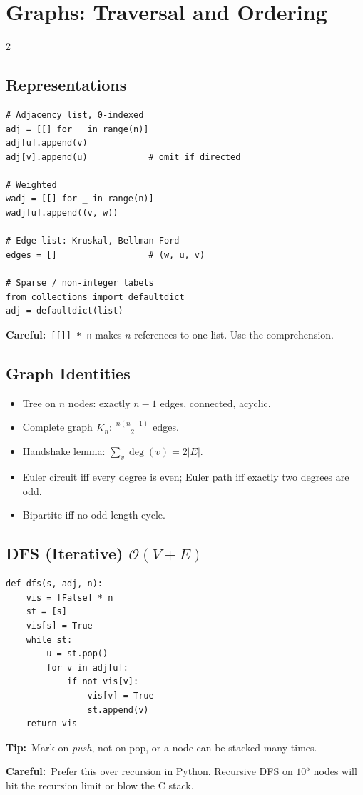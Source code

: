 \documentclass[10pt]{article}
\newcommand{\code}[1]{\texttt{\small #1}}
\newcommand{\sub}[2]{\subsection[#1]{#1\hspace{0.6em}%
  \textnormal{\color{accent2}\small$\mathcal{O}(#2)$}}}
\newcommand{\tip}[1]{{\color{tipc}\footnotesize\textbf{Tip:}}~{\footnotesize #1}\par}
\newcommand{\warn}[1]{{\color{warnc}\footnotesize\textbf{Careful:}}~{\footnotesize #1}\par}
\begin{document}
\section{Graphs: Traversal and Ordering}
\begin{multicols}{2}

\subsection{Representations}
\begin{lstlisting}
# Adjacency list, 0-indexed
adj = [[] for _ in range(n)]
adj[u].append(v)
adj[v].append(u)            # omit if directed

# Weighted
wadj = [[] for _ in range(n)]
wadj[u].append((v, w))

# Edge list: Kruskal, Bellman-Ford
edges = []                  # (w, u, v)

# Sparse / non-integer labels
from collections import defaultdict
adj = defaultdict(list)
\end{lstlisting}
\warn{\code{[[]] * n} makes $n$ references to one list. Use the
comprehension.}

\subsection{Graph Identities}
\begin{itemize}
    \item Tree on $n$ nodes: exactly $n-1$ edges, connected, acyclic.
    \item Complete graph $K_n$: $\frac{n(n-1)}{2}$ edges.
    \item Handshake lemma: $\sum_v \deg(v) = 2|E|$.
    \item Euler circuit iff every degree is even; Euler path iff exactly
          two degrees are odd.
    \item Bipartite iff no odd-length cycle.
\end{itemize}

\sub{DFS (Iterative)}{V + E}
\begin{lstlisting}
def dfs(s, adj, n):
    vis = [False] * n
    st = [s]
    vis[s] = True
    while st:
        u = st.pop()
        for v in adj[u]:
            if not vis[v]:
                vis[v] = True
                st.append(v)
    return vis
\end{lstlisting}
\tip{Mark on \emph{push}, not on pop, or a node can be stacked many
times.}
\warn{Prefer this over recursion in Python. Recursive DFS on $10^5$
nodes will hit the recursion limit or blow the C stack.}


\end{multicols}
\end{document}
